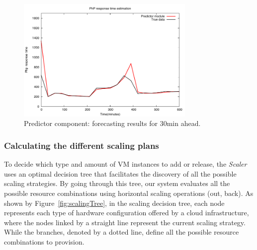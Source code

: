 

\begin{figure}[htb]
  \begin{center}
    \includegraphics[width=\linewidth,height=6cm]{images/prediction_conpaas_30min}
  \end{center}
\vspace{-5mm}
  \caption{Predictor component: forecasting results for 30min ahead.}
  \label{fig:forecast}
\end{figure}


\subsubsection{Calculating the different scaling plans}

To decide which type and amount of VM instances to add or release, the \emph{Scaler} uses an optimal decision tree that facilitates the discovery of all the possible scaling strategies. By going through this tree, our system evaluates all the possible resource combinations using horizontal scaling operations (out, back). As shown by Figure~\ref{fig:scalingTree}, in the scaling decision tree, each node represents each type of hardware configuration offered by a cloud infrastructure, where the nodes linked by a straight line represent the current scaling strategy. While the branches, denoted by a dotted line, define all the possible resource combinations to provision. 

